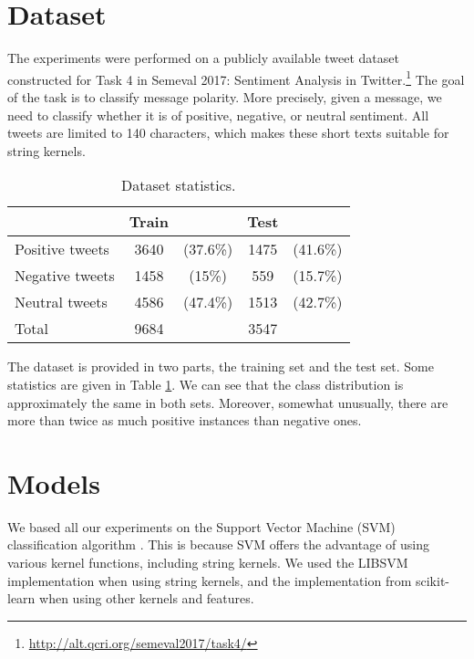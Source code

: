 \documentclass[final]{ieee}
\begin{document}
\section{Dataset}
The experiments were performed on a publicly available tweet dataset constructed for Task 4 in Semeval 2017: Sentiment Analysis in Twitter.\footnote{\url{http://alt.qcri.org/semeval2017/task4/}} The goal of the task is to classify message polarity. More precisely, given a message, we need to classify whether it is of positive, negative, or neutral sentiment. All tweets are limited to 140 characters, which makes these short texts suitable for string kernels.

\begin{table}[!ht]
\small
\centering
\begin{tabular}{@{}l c c c c@{}}
\toprule
   & Train & & Test \\ \midrule
  Positive tweets & 3640 & (37.6\%) & 1475 & (41.6\%) \\
  Negative tweets & 1458 & (15\%) & 559 & (15.7\%) \\
  Neutral tweets & 4586 & (47.4\%) & 1513 & (42.7\%) \\ \midrule
  Total & 9684 & & 3547 \\
\bottomrule
\end{tabular}
\caption{Dataset statistics.}
\label{tab:data}
\end{table}

The dataset is provided in two parts, the training set and the test set. Some statistics are given in Table \ref{tab:data}. We can see that the class distribution is approximately the same in both sets. Moreover, somewhat unusually, there are more than twice as much positive instances than negative ones.

\section{Models}
We based all our experiments on the Support Vector Machine (SVM) classification algorithm \citep{cortes1995support}. This is because SVM offers the advantage of using various kernel functions, including string kernels. We used the LIBSVM implementation \citep{chang2011libsvm} when using string kernels, and the implementation from scikit-learn \citep{scikit-learn} when using other kernels and features.
\end{document}
